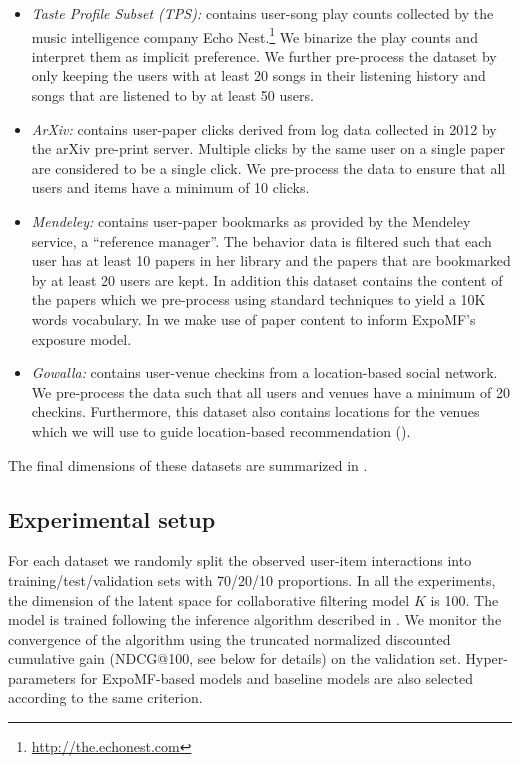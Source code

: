 \begin{itemize}
\item \emph{Taste Profile Subset (TPS):} contains user-song play counts
collected by the music intelligence company Echo
Nest.\footnote{\url{http://the.echonest.com}} We binarize the play counts and
interpret them as implicit preference. We further pre-process the dataset by
only keeping the users with at least 20 songs in their listening history and
songs that are listened to by at least 50 users. 

\item \emph{ArXiv:} contains user-paper clicks derived from log data collected
in 2012 by the arXiv pre-print server. Multiple clicks
by the same user on a single paper are considered to be a single click. We
pre-process the data to ensure that all users and items have a minimum of 10
clicks. 

\item \emph{Mendeley:} contains user-paper bookmarks as provided by 
the Mendeley service, a ``reference
manager''. The behavior data is filtered such that each
user has at least 10 papers in her library and the papers that are bookmarked
by at least 20 users are kept. In addition this dataset contains the
content of the papers which we pre-process using standard techniques to
yield a 10K words vocabulary. In  we make use of paper
content to inform ExpoMF's exposure model.  

\item \emph{Gowalla:} contains user-venue checkins from a location-based social
network. We pre-process the data such that all
users and venues have a minimum of 20 checkins. Furthermore, this dataset
also contains locations for the venues which we will use to guide 
location-based recommendation ().  
\end{itemize}

The final dimensions of these datasets are summarized in .

\subsection{Experimental setup} 

For each dataset we randomly split the observed user-item interactions
into training/test/validation sets with 70/20/10 proportions. In all the experiments, the dimension 
of the latent space for collaborative filtering model $K$ is 100. The
model is trained following the inference algorithm described in
. We monitor the convergence of the algorithm using
the truncated normalized discounted cumulative gain ({NDCG@100}, see below for
details) on the validation set. Hyper-parameters for ExpoMF-based models
and baseline models are also selected according to the same criterion.

